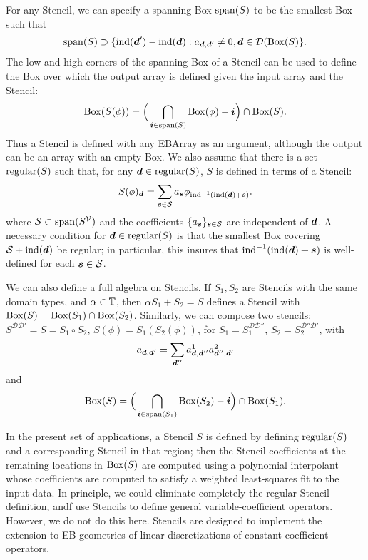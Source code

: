 \documentclass[12pt]{article}
\newcommand{\mcl}[1]{{\mathcal{#1}}}
\newcommand{\ind}{{\rm{ind}}}
\newcommand{\regular}{{\rm{regular}}}
\newcommand{\spanEB}{{\rm{span}}}
\newcommand{\MBox}{{\rm{Box}}}
\newcommand{\dgen}{{\mbf{d}}}
\begin{document}
\noindent
For any Stencil, we can specify a spanning Box $\spanEB(S)$ to be the smallest Box such that 
\begin{gather*}
\spanEB(S) \supset \{\ind(\dgen') - \ind(\dgen):a_{\dgen,\dgen'} \neq 0, \dgen \in \mcl{D}(\MBox(S)\}.
\end{gather*}
The low and high corners of the spanning Box of a Stencil can be used to define the Box over which the output array is defined given the input array and the Stencil: 
\begin{gather*}
\MBox(S(\phi)) = \Big(\bigcap \limits_{\mbf{i} \in \spanEB(S)} \MBox(\phi) - \mbf{i} \Big) \cap \MBox(S).
\end{gather*}
Thus a Stencil is defined with any EBArray as an argument, although the output can be an array with an empty Box. 
We also assume that there is a set $\regular(S)$ such that, for any $\dgen \in \regular(S)$,  $S$ is defined in terms of a  Stencil: 
\begin{gather*}
S (\phi)_\dgen = \sum \limits_{\mbf{s} \in \mcl{S}} a_{\mbf{s}} \phi_{\ind^{-1}(\ind(\dgen) + \mbf{s})}.
\end{gather*}
where $\mcl{S} \subset \spanEB(S^\mcl{V})$ and the coefficients $\{a_\mbf{s}\}_{\mbf{s} \in \mcl{S}}$ are independent of $\dgen$. A necessary condition for $\dgen \in \regular(S)$ is that the smallest Box covering $\mcl{S} + \ind(\dgen)$ be regular; in particular, this insures that $\ind^{-1}(\ind(\dgen) + \mbf{s})$ is well-defined for each $\mbf{s} \in \mcl{S}$. 

We can also define a full algebra on Stencils. If $S_1,S_2$ are Stencils with the same domain types, and $\alpha \in \mathbb{T}$, then
$\alpha S_1 + S_2= S$ defines a Stencil with $\MBox(S) = \MBox(S_1) \cap \MBox(S_2)$. Similarly, we can compose two stencils: $S^{\mcl{D}\mcl{D}'}= S = S_1 \circ S_2$, $S(\phi) = S_1(S_2(\phi))$, for $S_1 = S_1^{\mcl{D}\mcl{D}''}$, $S_2 = S_2^{\mcl{D''}\mcl{D}'}$,
with
\begin{gather*}
a_{\dgen,\dgen'} = \sum \limits_{\dgen ''} a_{\dgen,\dgen''}^1 a_{\dgen'',\dgen'}^2
\end{gather*}
and 
\begin{gather*}
\MBox(S) = \Big(\bigcap \limits_{\mbf{i} \in \spanEB(S_1)} \MBox(S_2) - \mbf{i} \Big) \cap \MBox(S_1).
\end{gather*}

In the present set of applications, a Stencil $S$ is defined by defining $\regular(S)$ and a corresponding  Stencil in that region; then the Stencil coefficients at the remaining locations in $\MBox(S)$ are computed using a polynomial interpolant whose coefficients are computed to satisfy a weighted least-squares fit to the input data. In principle, we could eliminate completely the regular Stencil definition, andf use Stencils to define general variable-coefficient operators. However, we do not do this here. Stencils are designed to implement the extension to EB geometries of linear discretizations of constant-coefficient operators.
\end{document}
